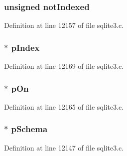 \subsubsection[{not\+Indexed}]{\setlength{\rightskip}{0pt plus 5cm}unsigned not\+Indexed}\label{struct_src_list_1_1_src_list__item_a26908f376e50467dcb8365eb7a75c0f4}


Definition at line 12157 of file sqlite3.\+c.

\hypertarget{struct_src_list_1_1_src_list__item_a2bf7196ac1f39bd4b9dc95c3a9e9a68e}{}
\subsubsection[{p\+Index}]{$\ast$ p\+Index}\label{struct_src_list_1_1_src_list__item_a2bf7196ac1f39bd4b9dc95c3a9e9a68e}


Definition at line 12169 of file sqlite3.\+c.

\hypertarget{struct_src_list_1_1_src_list__item_ae72acbfcc1ce3013b264aaa1f74c04c2}{}
\subsubsection[{p\+On}]{$\ast$ p\+On}\label{struct_src_list_1_1_src_list__item_ae72acbfcc1ce3013b264aaa1f74c04c2}


Definition at line 12165 of file sqlite3.\+c.

\hypertarget{struct_src_list_1_1_src_list__item_ac262c2ca980f0326edbe82bbe7fda205}{}
\subsubsection[{p\+Schema}]{$\ast$ p\+Schema}\label{struct_src_list_1_1_src_list__item_ac262c2ca980f0326edbe82bbe7fda205}


Definition at line 12147 of file sqlite3.\+c.

